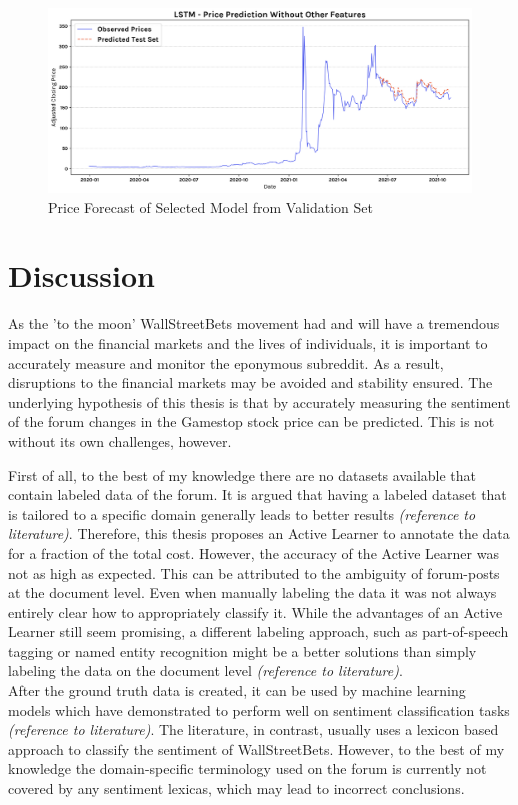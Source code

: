 \documentclass[11pt, a4paper]{article}
\begin{document}
\begin{figure}[!ht]
    \centering
    \includegraphics[scale=0.4]{no_other_feature_pred.png}
    \caption{Price Forecast of Selected Model from Validation Set}
    \label{fig:price_forecast_best_model}
\end{figure}


\newpage
\section{Discussion}

As the 'to the moon' WallStreetBets movement had and will have a tremendous impact on the financial markets
and the lives of individuals, it is important to accurately measure and monitor the eponymous subreddit.
As a result, disruptions to the financial markets may be avoided and stability ensured.
The underlying hypothesis of this thesis is that by accurately measuring the sentiment of the forum changes in the Gamestop stock price can be predicted.
This is not without its own challenges, however.

First of all, to the best of my knowledge there are no datasets available that contain labeled data of the forum. It is
argued that having a labeled dataset that is tailored to a specific domain generally leads to better results \emph{(reference to literature)}.
Therefore, this thesis proposes an Active Learner to annotate the data for a fraction of the total cost.
However, the accuracy of the Active Learner was not as high as expected.
This can be attributed to the ambiguity of forum-posts at the document level.
Even when manually labeling the data it was not always entirely clear how to appropriately classify it. 
While the advantages of an Active Learner still seem promising, a different labeling approach, such as part-of-speech tagging or
named entity recognition might be a better solutions than simply labeling the data on the document level \emph{(reference to literature)}.\\
After the ground truth data is created, it can be used by machine learning models which have demonstrated to perform well on sentiment classification tasks \emph{(reference to literature)}.
The literature, in contrast, usually uses a lexicon based approach to classify the sentiment of WallStreetBets.
However, to the best of my knowledge the domain-specific terminology used on the forum is currently not covered by any sentiment lexicas,
which may lead to incorrect conclusions.
\end{document}
